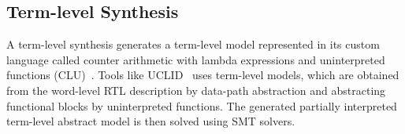 {\subsection{Term-level Synthesis}
A term-level synthesis generates a term-level model represented 
in its custom language called counter arithmetic with lambda 
expressions and uninterpreted functions (CLU)~\cite{uclid}.  Tools 
like UCLID~\cite{uclid} uses term-level models, which are obtained 
from the word-level RTL description by data-path abstraction and 
abstracting functional blocks by uninterpreted functions.  The 
generated partially interpreted term-level abstract model is then 
solved using SMT solvers.  
}

%
